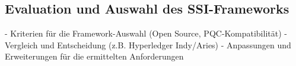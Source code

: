 \subsection{Evaluation und Auswahl des SSI-Frameworks} \label{sec:Evaluation und Auswahl des SSI-Frameworks}

- Kriterien für die Framework-Auswahl (Open Source, PQC-Kompatibilität)
- Vergleich und Entscheidung (z.B. Hyperledger Indy/Aries)
- Anpassungen und Erweiterungen für die ermittelten Anforderungen